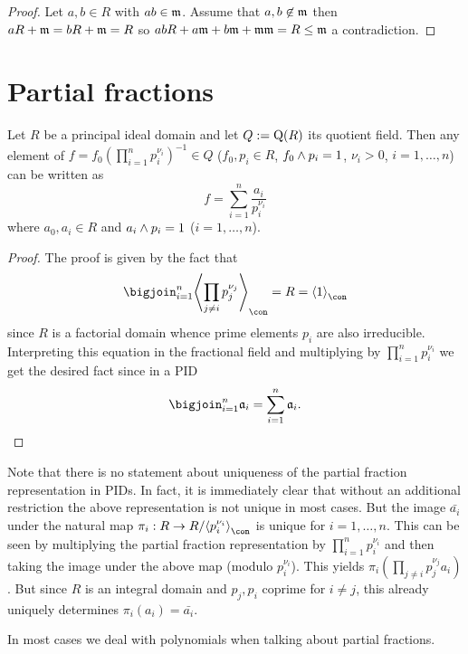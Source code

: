 \documentclass[8pt,a4paper]{article}
\begin{document}
\begin{proof}
    Let $a,b\in R$ with $ab\in \mathfrak{m}$. Assume that $a,b\not\in\mathfrak{m}$ then $aR+\mathfrak{m}=bR+\mathfrak{m}=R$ so $abR+a\mathfrak{m}+b\mathfrak{m}+\mathfrak{m}\mathfrak{m}=R\leq \mathfrak{m}$ a contradiction. 
\end{proof}

\section{Partial fractions}

\begin{lemma} Let $R$ be a principal ideal domain and let $Q:=\mathop{\mathrm{Q}}(R)$ its quotient field. Then any element of $f=f_0{(\prod_{i=1}^n{p_i^{\nu_i}})}^{-1}\in Q$ ($f_0,p_i\in R$, $f_0\wedge p_i=1$, $\nu_i>0$, $i=1,\ldots,n$) can be written as
    $$
    f = \sum_{i=1}^n{\frac{a_i}{p_i^{\nu_i}}}
    $$
    where $a_0,a_i\in R$ and $a_i\wedge p_i=1$ ($i=1,\ldots,n$).
\end{lemma}

\begin{proof}
    The proof is given by the fact that
    $$
    \bigjoin_{i=1}^n{\gen[\con]{\prod_{j\neq i}{p_j^{\nu_j}}}}=R=\gen[\con]{1}
    $$
    since $R$ is a factorial domain whence prime elements $p_i$ are also irreducible.
    Interpreting this equation in the fractional field and multiplying by $\prod_{i=1}^n{p_i^{\nu_i}}$ we get the desired fact since in a PID
        $$
        \bigjoin_{i=1}^n{\fka_i}=\sum_{i=1}^n{\fka_i}.
        $$
\end{proof}

\begin{remark}[uniqueness]
    Note that there is no statement about uniqueness of the partial fraction representation in PIDs. In fact, it is immediately clear that without an additional restriction the above representation is not unique in most cases.
    But the image $\bar{a_i}$ under the natural map $\pi_i:R\to R/\gen[\con]{p_i^{\nu_i}}$ is unique for $i=1,\ldots,n$.
This can be seen by multiplying the partial fraction representation by $\prod_{i=1}^n{p_i^{\nu_i}}$ and then taking the image under the above map (modulo $p_i^{\nu_i}$). This yields $\pi_i(\prod_{j\neq i}{p_j^{\nu_j}}a_i)$. But since $R$ is an integral domain and $p_j, p_i$ coprime for $i\neq j$, this already uniquely determines $\pi_i(a_i)=\bar{a_i}$.
\end{remark}


In most cases we deal with polynomials when talking about partial fractions.
\end{document}
